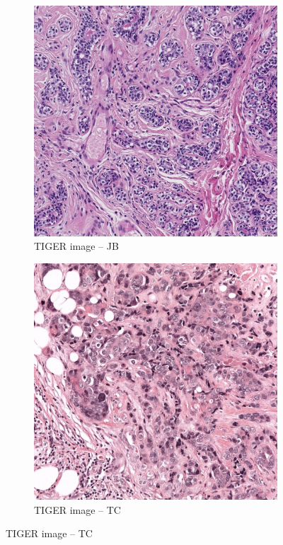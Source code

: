 \begin{figure}[H]
  \centering
  \begin{subfigure}[b]{0.32\textwidth}
    \centering
    \includegraphics[width=\linewidth]{assets/images/for_presentation/image_100B_[10779, 11621, 12102, 12874].png}
    \caption{TIGER image – JB}
    \label{fig:tiger-jb}
  \end{subfigure}\quad
  \begin{subfigure}[b]{0.32\textwidth}
    \centering
    \includegraphics[width=\linewidth]{assets/images/for_presentation/image_TC_S01_P000003_C0001_B104_[50106, 52730, 51199, 53794].png}
    \caption{TIGER image – TC}
    \label{fig:tiger-tc}
  \end{subfigure}


\end{figure}
